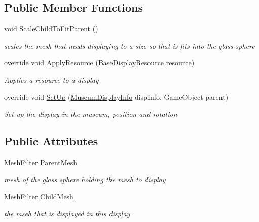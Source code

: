 \subsection*{Public Member Functions}
\begin{DoxyCompactItemize}
\item 
void \mbox{\hyperlink{class_mesh_display_a94176ce6e76cc683336051b49573ab1f}{Scale\+Child\+To\+Fit\+Parent}} ()
\begin{DoxyCompactList}\small\item\em scales the mesh that needs displaying to a size so that is fits into the glass sphere \end{DoxyCompactList}\item 
override void \mbox{\hyperlink{class_mesh_display_ab9a24f407a8ff995658097a98242095e}{Apply\+Resource}} (\mbox{\hyperlink{class_base_display_resource}{Base\+Display\+Resource}} resource)
\begin{DoxyCompactList}\small\item\em Applies a resource to a display \end{DoxyCompactList}\item 
override void \mbox{\hyperlink{class_mesh_display_adb19ca4d076a93df64d1c035663fce0f}{Set\+Up}} (\mbox{\hyperlink{class_museum_display_info}{Museum\+Display\+Info}} disp\+Info, Game\+Object parent)
\begin{DoxyCompactList}\small\item\em Set up the display in the museum, position and rotation \end{DoxyCompactList}\end{DoxyCompactItemize}
\subsection*{Public Attributes}
\begin{DoxyCompactItemize}
\item 
Mesh\+Filter \mbox{\hyperlink{class_mesh_display_a112cd7fd6e19ed52906cbb4240dc6735}{Parent\+Mesh}}
\begin{DoxyCompactList}\small\item\em mesh of the glass sphere holding the mesh to display \end{DoxyCompactList}\item 
Mesh\+Filter \mbox{\hyperlink{class_mesh_display_aef69e30c103e4ccea952b87876384d6d}{Child\+Mesh}}
\begin{DoxyCompactList}\small\item\em the mseh that is displayed in this display \end{DoxyCompactList}\end{DoxyCompactItemize}
